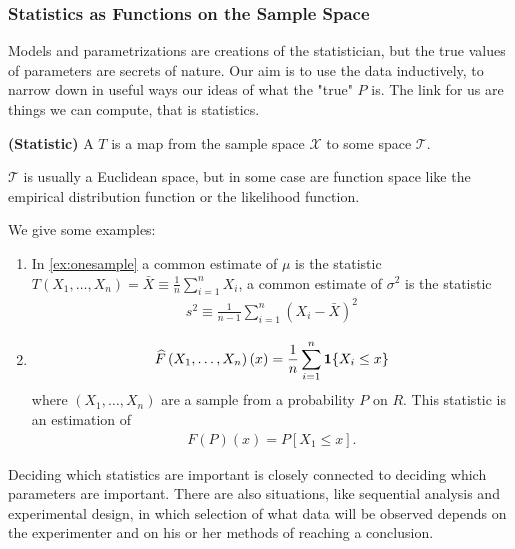 \documentclass{article}
\newcommand{\bfs}[1]{\textbf{({#1}) }}
\begin{document}
\subsubsection{Statistics as Functions on the Sample Space}
Models and parametrizations are creations of the statistician, but the true values of parameters are secrets of nature. Our aim is to use the data inductively, to narrow down in useful ways our ideas of what the "true" $P$ is. The link for us are things we can compute, that is statistics. 
\begin{defa}\bfs{Statistic}
 A  $T$ is a map from the sample space $\mathcal{X}$ to some space $\mathcal{T}$.
\end{defa}
\begin{rema}
$\mathcal{T}$ is usually a Euclidean space, but in some case are function space like the empirical distribution function or the likelihood function.
\end{rema}
\begin{exma} We give some examples:
\begin{enumerate}
    \item {} In \cref{ex:onesample} a common estimate of $\mu$ is the statistic $T\left(X_{1}, \ldots, X_{n}\right)=\bar{X} \equiv \frac{1}{n} \sum_{i=1}^{n} X_{i}$, a common estimate of $\sigma^{2}$ is the statistic
\begin{align*}
s^{2} \equiv \frac{1}{n-1} \sum_{i=1}^{n}\left(X_{i}-\bar{X}\right)^{2}
\end{align*}
\item {} 
\begin{align*}
\widehat{F}\left(X_{1}, \ldots, X_{n}\right)(x)=\frac{1}{n} \sum_{i=1}^{n} \indicate{X_{i} \leq x}
\end{align*}
where $\left(X_{1}, \ldots, X_{n}\right)$ are a sample from a probability $P$ on $R$. This statistic is an estimation of 
\begin{align*}
F(P)(x)=P\left[X_{1} \leq x\right] .
\end{align*}
\end{enumerate}
\end{exma}
\begin{rema}
Deciding which statistics are important is closely connected to deciding which parameters are important. There are also situations, like sequential analysis and experimental design, in which selection of what data will be observed depends on the experimenter and on his or her methods of reaching a conclusion.
\end{rema}
\end{document}
